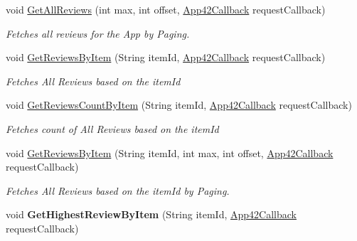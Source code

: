 \begin{DoxyCompactItemize}
\item 
void \hyperlink{classcom_1_1shephertz_1_1app42_1_1paas_1_1sdk_1_1windows_1_1review_1_1_review_service_ae423b8a17b6da559e0919b3437e102a4}{Get\+All\+Reviews} (int max, int offset, \hyperlink{interfacecom_1_1shephertz_1_1app42_1_1paas_1_1sdk_1_1windows_1_1_app42_callback}{App42\+Callback} request\+Callback)
\begin{DoxyCompactList}\small\item\em Fetches all reviews for the App by Paging. \end{DoxyCompactList}\item 
void \hyperlink{classcom_1_1shephertz_1_1app42_1_1paas_1_1sdk_1_1windows_1_1review_1_1_review_service_ab154fbbf1e5465cc88804c8ca946276e}{Get\+Reviews\+By\+Item} (String item\+Id, \hyperlink{interfacecom_1_1shephertz_1_1app42_1_1paas_1_1sdk_1_1windows_1_1_app42_callback}{App42\+Callback} request\+Callback)
\begin{DoxyCompactList}\small\item\em Fetches All Reviews based on the item\+Id \end{DoxyCompactList}\item 
void \hyperlink{classcom_1_1shephertz_1_1app42_1_1paas_1_1sdk_1_1windows_1_1review_1_1_review_service_a101ea01de0ad314978b6dc40496bf71b}{Get\+Reviews\+Count\+By\+Item} (String item\+Id, \hyperlink{interfacecom_1_1shephertz_1_1app42_1_1paas_1_1sdk_1_1windows_1_1_app42_callback}{App42\+Callback} request\+Callback)
\begin{DoxyCompactList}\small\item\em Fetches count of All Reviews based on the item\+Id \end{DoxyCompactList}\item 
void \hyperlink{classcom_1_1shephertz_1_1app42_1_1paas_1_1sdk_1_1windows_1_1review_1_1_review_service_a78d2b8ebed8f24ae82347d6ffa3f1de3}{Get\+Reviews\+By\+Item} (String item\+Id, int max, int offset, \hyperlink{interfacecom_1_1shephertz_1_1app42_1_1paas_1_1sdk_1_1windows_1_1_app42_callback}{App42\+Callback} request\+Callback)
\begin{DoxyCompactList}\small\item\em Fetches All Reviews based on the item\+Id by Paging. \end{DoxyCompactList}\item 
\hypertarget{classcom_1_1shephertz_1_1app42_1_1paas_1_1sdk_1_1windows_1_1review_1_1_review_service_af40baecef41b1c3af9464250a832aa47}{void {\bfseries Get\+Highest\+Review\+By\+Item} (String item\+Id, \hyperlink{interfacecom_1_1shephertz_1_1app42_1_1paas_1_1sdk_1_1windows_1_1_app42_callback}{App42\+Callback} request\+Callback)}\label{classcom_1_1shephertz_1_1app42_1_1paas_1_1sdk_1_1windows_1_1review_1_1_review_service_af40baecef41b1c3af9464250a832aa47}


\end{DoxyCompactItemize}

